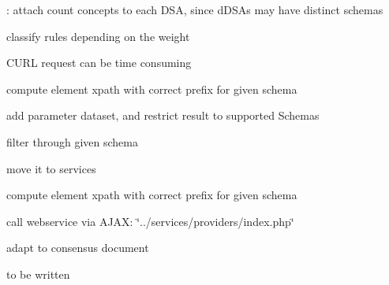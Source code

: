 
\begin{DoxyRefList}
\item[\label{todo__todo000008}%
\hypertarget{todo__todo000008}{}%
Global \hyperlink{backend_8js_a771a32402016a259aee9ff74cd879048}{add\+Count} ()]\+: attach count concepts to each D\+SA, since d\+D\+S\+As may have distinct schemas  
\item[\label{todo__todo000002}%
\hypertarget{todo__todo000002}{}%
File \hyperlink{check_for_errors_8php}{check\+For\+Errors.php} ]classify rules depending on the weight 
\item[\label{todo__todo000003}%
\hypertarget{todo__todo000003}{}%
File \hyperlink{check_rules_8php}{check\+Rules.php} ]C\+U\+RL request can be time consuming 
\item[\label{todo__todo000005}%
\hypertarget{todo__todo000005}{}%
Global \hyperlink{namespace_consistency_a6de4812dd264c558f2dadf3ae20b1da2}{Consistency\+:\+:\$concept\+\_\+xpath} ]compute element xpath with correct prefix for given schema  
\item[\label{todo__todo000006}%
\hypertarget{todo__todo000006}{}%
Global \hyperlink{namespace_consistency_aa98f8a888d842fcaefeca3407c10435c}{Consistency\+:\+:get\+Schema\+Mappings} (\$mapping)]add parameter dataset, and restrict result to supported Schemas  
\item[\label{todo__todo000001}%
\hypertarget{todo__todo000001}{}%
File \hyperlink{get_all_count_concepts_8php}{get\+All\+Count\+Concepts.php} ]filter through given schema 

move it to services 
\item[\label{todo__todo000004}%
\hypertarget{todo__todo000004}{}%
File \hyperlink{get_example_values_8php}{get\+Example\+Values.php} ]compute element xpath with correct prefix for given schema 
\item[\label{todo__todo000007}%
\hypertarget{todo__todo000007}{}%
File \hyperlink{consistency_2index_8php}{index.php} ]call webservice via A\+J\+AX\+: \char`\"{}../services/providers/index.\+php\char`\"{}  
\item[\label{todo__todo000010}%
\hypertarget{todo__todo000010}{}%
Global \hyperlink{consistency_8js_a0cd14e63b9113fcee3fa0e999aa1ada9}{is\+Valid\+Citation} (str)]adapt to consensus document 
\item[\label{todo__todo000009}%
\hypertarget{todo__todo000009}{}%
Global \hyperlink{consistency_8js_afe73f65f5154e4738551f8fe2172e4e1}{match\+Rule} (function\+Name, url)]to be written 
\end{DoxyRefList}